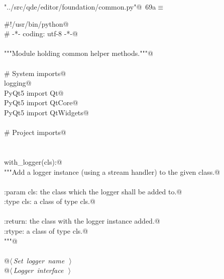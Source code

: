 \documentclass[
    a4paper,      %
    10pt,         %
    openright,    %
    notitlepage,  %
    parskip=half, %
]{scrreprt}       %
\theoremstyle{definition}                    %
\begin{document}
\begin{flushleft} \small
\begin{minipage}{\linewidth}\label{scrap117}\raggedright\small
{} \verb@"../src/qde/editor/foundation/common.py"@\nobreak\ {\footnotesize {69a}}$\equiv$
\vspace{-1ex}
\begin{list}{}{} \item
\mbox{}\lstinline@#!/usr/bin/python@\\
\mbox{}\lstinline@# -*- coding: utf-8 -*-@\\
\mbox{}\lstinline@@\\
\mbox{}\lstinline@"""Module holding common helper methods."""@\\
\mbox{}\lstinline@@\\
\mbox{}\lstinline@# System imports@\\
\mbox{}\lstinline@import logging@\\
\mbox{}\lstinline@from PyQt5 import Qt@\\
\mbox{}\lstinline@from PyQt5 import QtCore@\\
\mbox{}\lstinline@from PyQt5 import QtWidgets@\\
\mbox{}\lstinline@@\\
\mbox{}\lstinline@# Project imports@\\
\mbox{}\lstinline@@\\
\mbox{}\lstinline@@\\
\mbox{}\lstinline@def with_logger(cls):@\\
\mbox{}\lstinline@    """Add a logger instance (using a stream handler) to the given class.@\\
\mbox{}\lstinline@@\\
\mbox{}\lstinline@    :param cls: the class which the logger shall be added to.@\\
\mbox{}\lstinline@    :type  cls: a class of type cls.@\\
\mbox{}\lstinline@@\\
\mbox{}\lstinline@    :return: the class with the logger instance added.@\\
\mbox{}\lstinline@    :rtype:  a class of type cls.@\\
\mbox{}\lstinline@    """@\\
\mbox{}\lstinline@@\\
\mbox{}\lstinline@    @\hbox{$\langle\,${\itshape Set logger name}\nobreak\ {\footnotesize {}}$\,\rangle$}\lstinline@@\\
\mbox{}\lstinline@    @\hbox{$\langle\,${\itshape Logger interface}\nobreak\ {\footnotesize {}}$\,\rangle$}\lstinline@@\\
\mbox{}\lstinline@@{\NWsep}
\end{list}
\vspace{-1.5ex}
\footnotesize
\begin{list}{}{\setlength{\itemsep}{-\parsep}\setlength{\itemindent}{-\leftmargin}}

\item{}
\end{list}
\end{minipage}\vspace{4ex}
\end{flushleft}
\end{document}

